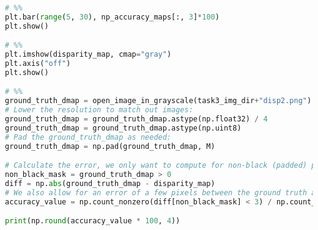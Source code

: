\documentclass{article}
\begin{document}
\begin{lstlisting}[language=Python]
# %%
plt.bar(range(5, 30), np_accuracy_maps[:, 3]*100)
plt.show()

# %%
plt.imshow(disparity_map, cmap="gray")
plt.axis("off")
plt.show()

# %%
ground_truth_dmap = open_image_in_grayscale(task3_img_dir+"disp2.png")
# Lower the resolution to match out images:
ground_truth_dmap = ground_truth_dmap.astype(np.float32) / 4
ground_truth_dmap = ground_truth_dmap.astype(np.uint8)
# Pad the ground_truth_dmap as needed:
ground_truth_dmap = np.pad(ground_truth_dmap, M)

# Calculate the error, we only want to compute for non-black (padded) pixels
non_black_mask = ground_truth_dmap > 0
diff = np.abs(ground_truth_dmap - disparity_map)
# We also allow for an error of a few pixels between the ground truth and the computed disparity map
accuracy_value = np.count_nonzero(diff[non_black_mask] < 3) / np.count_nonzero(non_black_mask)

print(np.round(accuracy_value * 100, 4))
\end{lstlisting}
\end{document}
